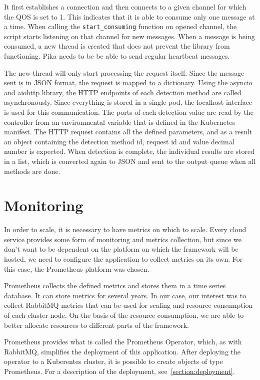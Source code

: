 It first establishes a connection and then connects to a given channel for which the QOS is set to 1. This indicates that it is able to consume only one message at a time. When calling the \texttt{start\_consuming} function on opened channel, the script starts listening on that channel for new messages. When a message is being consumed, a new thread is created that does not prevent the library from functioning. Pika needs to be be able to send regular heartbeat messages.~\cite{Pika}

The new thread will only start processing the request itself. Since the message sent is in JSON format, the request is mapped to a dictionary. Using the asyncio and aiohttp library, the HTTP endpoints of each detection method are called asynchronously. Since everything is stored in a single pod, the localhost interface is used for this communication. The ports of each detection value are read by the controller from an environmental variable that is defined in the Kubernetes manifest. The HTTP request contains all the defined parameters, and as a result an object containing the detection method id, request id and value decimal number is expected. When detection is complete, the individual results are stored in a list, which is converted again to JSON and sent to the output queue when all methods are done.

\section{Monitoring}
In order to scale, it is necessary to have metrics on which to scale. Every cloud service provides some form of monitoring and metrics collection, but since we don't want to be dependent on the platform on which the framework will be hosted, we need to configure the application to collect metrics on its own. For this case, the Prometheus platform was chosen.

Prometheus collects the defined metrics and stores them in a time series database. It can store metrics for several years. In our case, our interest was to collect RabbitMQ metrics that can be used for scaling and resource consumption of each cluster node. On the basis of the resource consumption, we are able to better allocate resources to different parts of the framework. 

Prometheus provides what is called the Prometheus Operator, which, as with RabbitMQ, simplifies the deployment of this application. After deploying the operator to a Kuberentes cluster, it is possible to create objects of type Prometheus. For a description of the deployment, see~\ref{section:deployment}.~\cite{PrometheusOperator}

